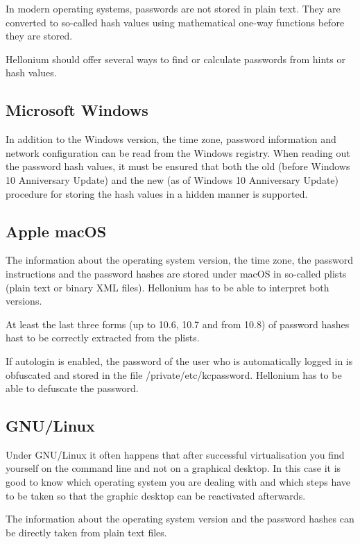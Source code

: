 In modern operating systems, passwords are not stored in plain text. They are converted to so-called hash values using mathematical one-way functions before they are stored.

Hellonium should offer several ways to find or calculate passwords from hints or hash values.

\subsection{Microsoft Windows}

In addition to the Windows version, the time zone, password information and network configuration can be read from the Windows registry.
When reading out the password hash values, it must be ensured that both the old (before Windows 10 Anniversary Update) and the new (as of Windows 10 Anniversary Update) procedure for storing the hash values in a hidden manner is supported.

\subsection{Apple macOS}

The information about the operating system version, the time zone, the password instructions and the password hashes are stored under macOS in so-called plists (plain text or binary XML files). Hellonium has to be able to interpret both versions.

At least the last three forms (up to 10.6, 10.7 and from 10.8) of password hashes hast to be correctly extracted from the plists.

If autologin is enabled, the password of the user who is automatically logged in is obfuscated and stored in the file /private/etc/kcpassword. Hellonium has to be able to defuscate the password.

\subsection{GNU/Linux}

Under GNU/Linux it often happens that after successful virtualisation you find yourself on the command line and not on a graphical desktop.
In this case it is good to know which operating system you are dealing with and which steps have to be taken so that the graphic desktop can be reactivated afterwards.

The information about the operating system version and the password hashes can be directly taken from plain text files.

